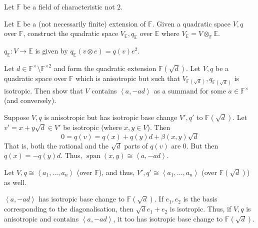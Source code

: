 \documentclass[12 pt, letterpaper]{hmcpset}
\begin{document}

Let $\mathbb{F}$ be a field of characteristic not $2$.

\begin{problem}[(1)]
	Let $\mathbb{E}$ be a (not necessarily finite) extension of $\mathbb{F}$. Given a quadratic space $V, q$ over $\mathbb{F}$, construct the quadratic space $V_{\mathbb{E}}, q_{\mathbb{E}}$ over $\mathbb{E}$ where $V_{\mathbb{E}} = V \otimes_{\mathbb{F}} \mathbb{E}$.
\end{problem}

\begin{solution}
	$q_{\mathbb{E}} : V \to \mathbb{E}$ is given by $q_{\mathbb{E}}(v \otimes e) = q(v) e^{2}$.
\end{solution}

\pagebreak

\begin{problem}[(2)]
	Let $d \in \mathbb{F}^{\times} \setminus \mathbb{F}^{\times 2}$ and form the quadratic extension $\mathbb{F}(\sqrt{d})$. Let $V, q$ be a quadratic space over $\mathbb{F}$ which is anisotropic but such that $V_{\mathbb{F}(\sqrt{d})}, q_{\mathbb{F}(\sqrt{d})}$ is isotropic. Then show that $V$ contains $\left < a, -ad \right >$ as a summand for some $a \in \mathbb{F}^{\times}$ (and conversely).
\end{problem}

\begin{solution}
	Suppose $V, q$ is anisotropic but has isotropic base change $V', q'$ to $\mathbb{F}(\sqrt{d})$. Let $v' = x + y \sqrt{d} \in V'$ be isotropic (where $x, y \in V$). Then
	\[
		0 = q(v) = q(x) + q(y) d + \beta(x, y) \sqrt{d}
	\] 
	That is, both the rational and the $\sqrt{d}$ parts of $q(v)$ are $0$. But then $q(x) = - q(y) d$. Thus, $\operatorname{span}(x, y) \cong \left < a, -ad \right >$.

	Let $V, q \cong \left < a_{1}, \dots, a_{n} \right >$ (over $\mathbb{F}$), and thus, $V', q' \cong \left < a_{1}, \dots, a_{n} \right >$ (over $\mathbb{F}(\sqrt{d})$) as well.

	$\left < a, -ad \right >$ has isotropic base change to $\mathbb{F}(\sqrt{d})$. If $e_{1}, e_{2}$ is the basis corresponding to the diagonalisation, then $\sqrt{d} e_{1} + e_{2}$ is isotropic. Thus, if $V, q$ is anisotropic and contains $\left < a, -ad \right >$, it too has isotropic base change to $\mathbb{F}(\sqrt{d})$.
\end{solution}

\pagebreak
\end{document}
